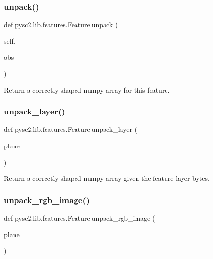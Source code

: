 \subsubsection{\texorpdfstring{unpack()}{unpack()}}
{\footnotesize\ttfamily def pysc2.\+lib.\+features.\+Feature.\+unpack (\begin{DoxyParamCaption}\item[{}]{self,  }\item[{}]{obs }\end{DoxyParamCaption})}

\begin{DoxyVerb}Return a correctly shaped numpy array for this feature.\end{DoxyVerb}
 \mbox{\label{classpysc2_1_1lib_1_1features_1_1_feature_ae2deeb3c743654425193f0b225c388e8}} 
\subsubsection{\texorpdfstring{unpack\+\_\+layer()}{unpack\_layer()}}
{\footnotesize\ttfamily def pysc2.\+lib.\+features.\+Feature.\+unpack\+\_\+layer (\begin{DoxyParamCaption}\item[{}]{plane }\end{DoxyParamCaption})\hspace{0.3cm}{\ttfamily [static]}}

\begin{DoxyVerb}Return a correctly shaped numpy array given the feature layer bytes.\end{DoxyVerb}
 \mbox{\label{classpysc2_1_1lib_1_1features_1_1_feature_addc5dd18d59ef32762876df736f4509d}} 
\subsubsection{\texorpdfstring{unpack\+\_\+rgb\+\_\+image()}{unpack\_rgb\_image()}}
{\footnotesize\ttfamily def pysc2.\+lib.\+features.\+Feature.\+unpack\+\_\+rgb\+\_\+image (\begin{DoxyParamCaption}\item[{}]{plane }\end{DoxyParamCaption})\hspace{0.3cm}{\ttfamily [static]}}

